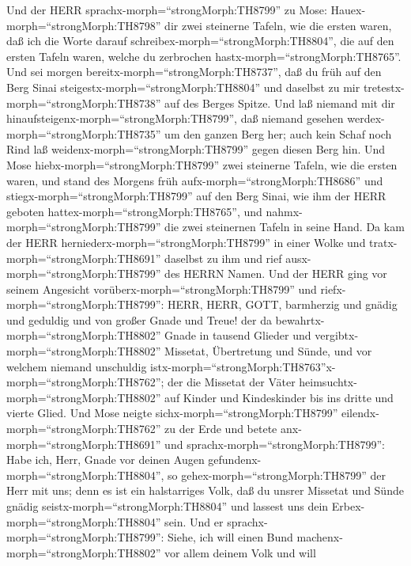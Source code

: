  Und der HERR sprachx-morph=``strongMorph:TH8799'' zu Mose:
Hauex-morph=``strongMorph:TH8798'' dir zwei steinerne Tafeln, wie die
ersten waren, daß ich die Worte darauf
schreibex-morph=``strongMorph:TH8804'', die auf den ersten Tafeln waren,
welche du zerbrochen hastx-morph=``strongMorph:TH8765''. 
Und sei morgen bereitx-morph=``strongMorph:TH8737'', daß du früh auf den
Berg Sinai steigestx-morph=``strongMorph:TH8804'' und daselbst zu mir
tretestx-morph=``strongMorph:TH8738'' auf des Berges Spitze.
 Und laß niemand mit dir
hinaufsteigenx-morph=``strongMorph:TH8799'', daß niemand gesehen
werdex-morph=``strongMorph:TH8735'' um den ganzen Berg her; auch kein
Schaf noch Rind laß weidenx-morph=``strongMorph:TH8799'' gegen diesen
Berg hin.  Und Mose hiebx-morph=``strongMorph:TH8799'' zwei
steinerne Tafeln, wie die ersten waren, und stand des Morgens früh
aufx-morph=``strongMorph:TH8686'' und
stiegx-morph=``strongMorph:TH8799'' auf den Berg Sinai, wie ihm der HERR
geboten hattex-morph=``strongMorph:TH8765'', und
nahmx-morph=``strongMorph:TH8799'' die zwei steinernen Tafeln in seine
Hand.  Da kam der HERR
herniederx-morph=``strongMorph:TH8799'' in einer Wolke und
tratx-morph=``strongMorph:TH8691'' daselbst zu ihm und rief
ausx-morph=``strongMorph:TH8799'' des HERRN Namen.  Und der
HERR ging vor seinem Angesicht vorüberx-morph=``strongMorph:TH8799'' und
riefx-morph=``strongMorph:TH8799'': HERR, HERR, GOTT, barmherzig und
gnädig und geduldig und von großer Gnade und Treue!  der da
bewahrtx-morph=``strongMorph:TH8802'' Gnade in tausend Glieder und
vergibtx-morph=``strongMorph:TH8802'' Missetat, Übertretung und Sünde,
und vor welchem niemand unschuldig
istx-morph=``strongMorph:TH8763''x-morph=``strongMorph:TH8762''; der die
Missetat der Väter heimsuchtx-morph=``strongMorph:TH8802'' auf Kinder
und Kindeskinder bis ins dritte und vierte Glied.  Und Mose
neigte sichx-morph=``strongMorph:TH8799''
eilendx-morph=``strongMorph:TH8762'' zu der Erde und betete
anx-morph=``strongMorph:TH8691''  und
sprachx-morph=``strongMorph:TH8799'': Habe ich, Herr, Gnade vor deinen
Augen gefundenx-morph=``strongMorph:TH8804'', so
gehex-morph=``strongMorph:TH8799'' der Herr mit uns; denn es ist ein
halstarriges Volk, daß du unsrer Missetat und Sünde gnädig
seistx-morph=``strongMorph:TH8804'' und lassest uns dein
Erbex-morph=``strongMorph:TH8804'' sein.  Und er
sprachx-morph=``strongMorph:TH8799'': Siehe, ich will einen Bund
machenx-morph=``strongMorph:TH8802'' vor allem deinem Volk und will
